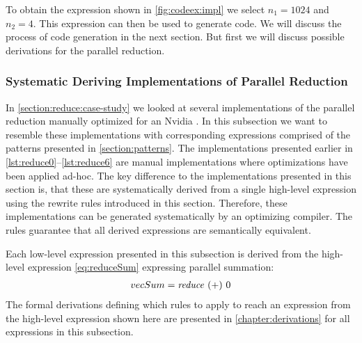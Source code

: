 To obtain the expression shown in \autoref{fig:codeex:impl} we select $n_1=1024$ and $n_2=4$.
This expression can then be used to generate \OpenCL code.
We will discuss the process of \OpenCL code generation in the next section.
But first we will discuss possible derivations for the parallel reduction.












\subsubsection{Systematic Deriving Implementations of Parallel Reduction}
\label{sec:deriving:reduce}

In \autoref{section:reduce:case-study} we looked at several implementations of the parallel reduction manually optimized for an Nvidia \GPU.
In this subsection we want to resemble these implementations with corresponding expressions comprised of the patterns presented in \autoref{section:patterns}.
The implementations presented earlier in \autoref{lst:reduce0}--\autoref{lst:reduce6} are manual implementations where optimizations have been applied ad-hoc.
The key difference to the implementations presented in this section is, that these are systematically derived from a single high-level expression using the rewrite rules introduced in this section.
Therefore, these implementations can be generated systematically by an optimizing compiler.
The rules guarantee that all derived expressions are semantically equivalent.

Each \OpenCL low-level expression presented in this subsection is derived from the high-level expression \autoref{eq:reduceSum} expressing parallel summation:
\begin{align}
  vecSum = \text{\textit{reduce}}\ (+)\ 0
  \label{eq:reduceSum}
\end{align}
%
The formal derivations defining which rules to apply to reach an expression from the high-level expression shown here are presented in \autoref{chapter:derivations} for all expressions in this subsection.

